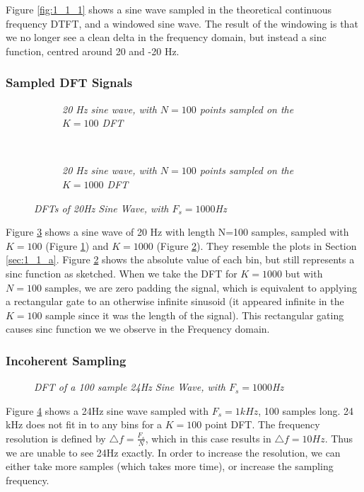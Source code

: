 \documentclass[./main.tex]{subfiles}
\begin{document}
Figure \ref{fig:1_1_1} shows a sine wave sampled in the theoretical continuous frequency DTFT, and a windowed sine wave. The result of the windowing is that we no longer see a clean delta in the frequency domain, but instead a sinc function, centred around 20 and -20 Hz.

\subsubsection{Sampled DFT Signals}

\begin{figure}[h]
      \centering
      \begin{subfigure}[b]{0.49\textwidth}
         \resizebox{\textwidth}{!}{}
  		\caption{\textit{20 Hz sine wave, with $N=100$ points sampled on the $K = 100$ DFT}}
  		\label{fig:1_1_b_100}
      \end{subfigure}
      ~ %
      \begin{subfigure}[b]{0.49\textwidth}
         \resizebox{\textwidth}{!}{}
 			\caption{\textit{20 Hz sine wave, with $N=100$ points sampled on the $K = 1000$ DFT}}
  		\label{fig:1_1_b_1000}
      \end{subfigure}
	\label{fig:1_1_b}
	\caption{\textit{DFTs of 20Hz Sine Wave, with $ F_s = 1000 $Hz}}
  \end{figure}

Figure \ref{fig:1_1_b} shows a sine wave of 20 Hz with length N=100 samples, sampled with $K=100$ (Figure \ref{fig:1_1_b_100}) and $K=1000$ (Figure \ref{fig:1_1_b_1000}). They resemble the plots in Section \ref{sec:1_1_a}. Figure \ref{fig:1_1_b_1000} shows the absolute value of each bin, but still represents a sinc function as sketched. When we take the DFT for $K=1000$ but with $N=100$ samples, we are zero padding the signal, which is equivalent to applying a rectangular gate to an otherwise infinite sinusoid (it appeared infinite in the $K=100$ sample since it was the length of the signal). This rectangular gating causes sinc function we we observe in the Frequency domain.

\subsubsection{Incoherent Sampling}

\begin{figure}[h]
	\centering 
	\resizebox{0.7\textwidth}{!}{}
	\caption{\textit{DFT of a 100 sample 24Hz Sine Wave, with $ F_s = 1000 $Hz}}
	\label{fig:1_1_c}
\end{figure}

Figure \ref{fig:1_1_c} shows a 24Hz sine wave sampled with $F_s = 1 kHz$, 100 samples long. 24 kHz does not fit in to any bins for a $K=100$ point DFT. The frequency resolution is defined by $ \bigtriangleup f = \frac{F_s}{N}$, which in this case results in $ \bigtriangleup f = 10 Hz$. Thus we are unable to see 24Hz exactly. In order to increase the resolution, we can either take more samples (which takes more time), or increase the sampling frequency.
\end{document}
